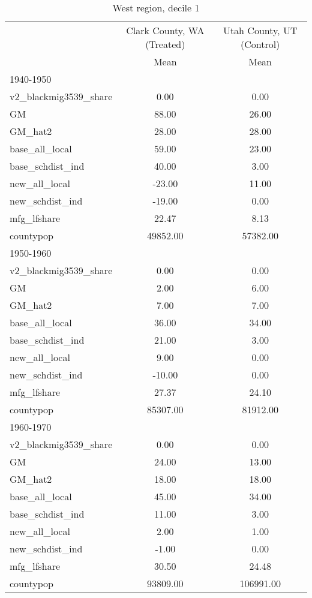 \begin{table}[htbp]\centering
\def\sym#1{\ifmmode^{#1}\else\(^{#1}\)\fi}
\caption{West region, decile 1 \label{tab1}}
\begin{tabular}{l*{2}{c}}
\toprule
                    &\multicolumn{1}{c}{Clark County, WA (Treated)}&\multicolumn{1}{c}{Utah County, UT (Control)}\\
                    &        Mean&        Mean\\
\midrule
1940-1950           &            &            \\
v2\_blackmig3539\_share&        0.00&        0.00\\
GM                  &       88.00&       26.00\\
GM\_hat2             &       28.00&       28.00\\
base\_all\_local      &       59.00&       23.00\\
base\_schdist\_ind    &       40.00&        3.00\\
new\_all\_local       &      -23.00&       11.00\\
new\_schdist\_ind     &      -19.00&        0.00\\
mfg\_lfshare         &       22.47&        8.13\\
countypop           &    49852.00&    57382.00\\
\midrule
1950-1960           &            &            \\
v2\_blackmig3539\_share&        0.00&        0.00\\
GM                  &        2.00&        6.00\\
GM\_hat2             &        7.00&        7.00\\
base\_all\_local      &       36.00&       34.00\\
base\_schdist\_ind    &       21.00&        3.00\\
new\_all\_local       &        9.00&        0.00\\
new\_schdist\_ind     &      -10.00&        0.00\\
mfg\_lfshare         &       27.37&       24.10\\
countypop           &    85307.00&    81912.00\\
\midrule
1960-1970           &            &            \\
v2\_blackmig3539\_share&        0.00&        0.00\\
GM                  &       24.00&       13.00\\
GM\_hat2             &       18.00&       18.00\\
base\_all\_local      &       45.00&       34.00\\
base\_schdist\_ind    &       11.00&        3.00\\
new\_all\_local       &        2.00&        1.00\\
new\_schdist\_ind     &       -1.00&        0.00\\
mfg\_lfshare         &       30.50&       24.48\\
countypop           &    93809.00&   106991.00\\
\bottomrule
\end{tabular}
\end{table}
